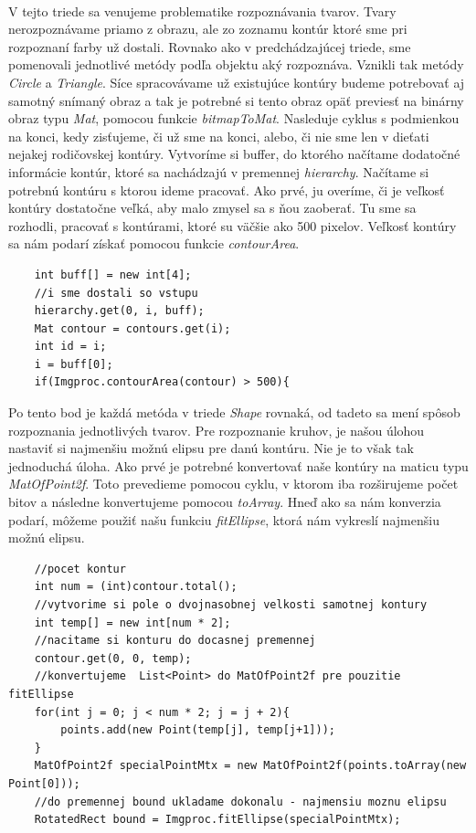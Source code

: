 \documentclass[12pt]{article}
\begin{document}
\paragraph{}
V tejto triede sa venujeme problematike rozpoznávania tvarov. Tvary nerozpoznávame priamo z obrazu, ale zo zoznamu kontúr ktoré sme pri rozpoznaní farby už dostali.
Rovnako ako v predchádzajúcej triede, sme pomenovali jednotlivé metódy podľa objektu aký rozpoznáva. Vznikli tak metódy \emph{Circle} a \emph{Triangle}.
Síce spracovávame už existujúce kontúry budeme potrebovať aj samotný snímaný obraz a tak je potrebné si tento obraz opäť previesť na binárny obraz typu \emph{Mat}, pomocou funkcie \emph{bitmapToMat}.
Nasleduje cyklus s podmienkou na konci, kedy zisťujeme, či už sme na konci, alebo, či nie sme len v dieťati nejakej rodičovskej kontúry. Vytvoríme si buffer, do ktorého načítame dodatočné informácie kontúr, ktoré sa nachádzajú v premennej \emph{hierarchy}.
Načítame si potrebnú kontúru s ktorou ideme pracovať. Ako prvé, ju overíme, či je veľkosť kontúry dostatočne veľká, aby malo zmysel sa s ňou zaoberať. Tu sme sa rozhodli, pracovať s kontúrami, ktoré su väčšie ako 500 pixelov.
Veľkosť kontúry sa nám podarí získať pomocou funkcie \emph{contourArea}.
\begin{lstlisting}
	int buff[] = new int[4];
	//i sme dostali so vstupu
	hierarchy.get(0, i, buff);
	Mat contour = contours.get(i);
	int id = i;
	i = buff[0];
	if(Imgproc.contourArea(contour) > 500){
\end{lstlisting}
Po tento bod je každá metóda v triede \emph{Shape} rovnaká, od tadeto sa mení spôsob rozpoznania jednotlivých tvarov. 
Pre rozpoznanie kruhov, je našou úlohou nastaviť si najmenšiu možnú elipsu pre danú kontúru.
Nie je to však tak jednoduchá úloha. Ako prvé je potrebné konvertovať naše kontúry na maticu typu \emph{MatOfPoint2f}.
Toto prevedieme pomocou cyklu, v ktorom iba rozširujeme počet bitov a následne konvertujeme pomocou \emph{toArray}.
Hneď ako sa nám konverzia podarí, môžeme použiť našu funkciu \emph{fitEllipse}, ktorá nám vykreslí najmenšiu možnú elipsu.
\begin{lstlisting}
	//pocet kontur
	int num = (int)contour.total();
	//vytvorime si pole o dvojnasobnej velkosti samotnej kontury
	int temp[] = new int[num * 2];
	//nacitame si konturu do docasnej premennej
	contour.get(0, 0, temp);
	//konvertujeme  List<Point> do MatOfPoint2f pre pouzitie fitEllipse
	for(int j = 0; j < num * 2; j = j + 2){
		points.add(new Point(temp[j], temp[j+1]));
	}
	MatOfPoint2f specialPointMtx = new MatOfPoint2f(points.toArray(new Point[0])); 
	//do premennej bound ukladame dokonalu - najmensiu moznu elipsu
	RotatedRect bound = Imgproc.fitEllipse(specialPointMtx);
\end{lstlisting}
\end{document}
